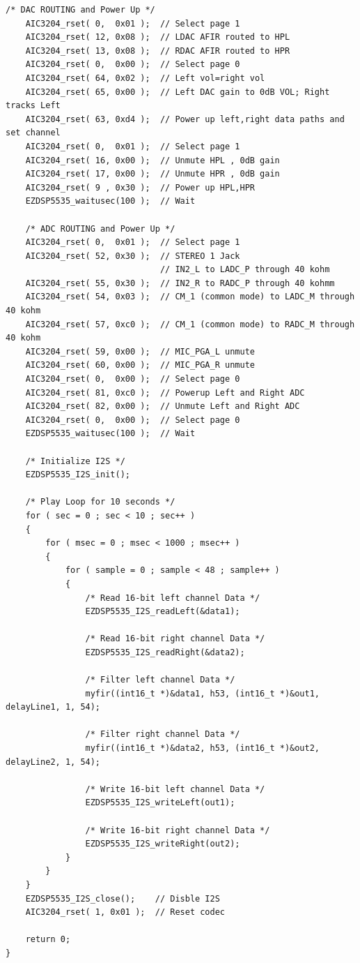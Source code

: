\documentclass[11pt,pdftex,portrait,letterpaper]{article}
\begin{document}
\begin{lstlisting}[caption={aic3204 audio loop}, label=l:aic3204]
    /* DAC ROUTING and Power Up */
    AIC3204_rset( 0,  0x01 );  // Select page 1
    AIC3204_rset( 12, 0x08 );  // LDAC AFIR routed to HPL
    AIC3204_rset( 13, 0x08 );  // RDAC AFIR routed to HPR
    AIC3204_rset( 0,  0x00 );  // Select page 0
    AIC3204_rset( 64, 0x02 );  // Left vol=right vol
    AIC3204_rset( 65, 0x00 );  // Left DAC gain to 0dB VOL; Right tracks Left
    AIC3204_rset( 63, 0xd4 );  // Power up left,right data paths and set channel
    AIC3204_rset( 0,  0x01 );  // Select page 1
    AIC3204_rset( 16, 0x00 );  // Unmute HPL , 0dB gain
    AIC3204_rset( 17, 0x00 );  // Unmute HPR , 0dB gain
    AIC3204_rset( 9 , 0x30 );  // Power up HPL,HPR
    EZDSP5535_waitusec(100 );  // Wait
    
    /* ADC ROUTING and Power Up */
    AIC3204_rset( 0,  0x01 );  // Select page 1
    AIC3204_rset( 52, 0x30 );  // STEREO 1 Jack
                               // IN2_L to LADC_P through 40 kohm
    AIC3204_rset( 55, 0x30 );  // IN2_R to RADC_P through 40 kohmm
    AIC3204_rset( 54, 0x03 );  // CM_1 (common mode) to LADC_M through 40 kohm
    AIC3204_rset( 57, 0xc0 );  // CM_1 (common mode) to RADC_M through 40 kohm
    AIC3204_rset( 59, 0x00 );  // MIC_PGA_L unmute
    AIC3204_rset( 60, 0x00 );  // MIC_PGA_R unmute
    AIC3204_rset( 0,  0x00 );  // Select page 0
    AIC3204_rset( 81, 0xc0 );  // Powerup Left and Right ADC
    AIC3204_rset( 82, 0x00 );  // Unmute Left and Right ADC
    AIC3204_rset( 0,  0x00 );  // Select page 0 
    EZDSP5535_waitusec(100 );  // Wait
    
    /* Initialize I2S */
    EZDSP5535_I2S_init();
     
    /* Play Loop for 10 seconds */
    for ( sec = 0 ; sec < 10 ; sec++ )
    {
        for ( msec = 0 ; msec < 1000 ; msec++ )
        {
            for ( sample = 0 ; sample < 48 ; sample++ )
            {
                /* Read 16-bit left channel Data */
                EZDSP5535_I2S_readLeft(&data1);
                
                /* Read 16-bit right channel Data */
                EZDSP5535_I2S_readRight(&data2);
                
                /* Filter left channel Data */
                myfir((int16_t *)&data1, h53, (int16_t *)&out1, delayLine1, 1, 54);

                /* Filter right channel Data */
                myfir((int16_t *)&data2, h53, (int16_t *)&out2, delayLine2, 1, 54);

                /* Write 16-bit left channel Data */
                EZDSP5535_I2S_writeLeft(out1);
                
                /* Write 16-bit right channel Data */
                EZDSP5535_I2S_writeRight(out2);
            }
        }
    }
    EZDSP5535_I2S_close();    // Disble I2S
    AIC3204_rset( 1, 0x01 );  // Reset codec
    
    return 0;
}

\end{lstlisting}
\end{document}
